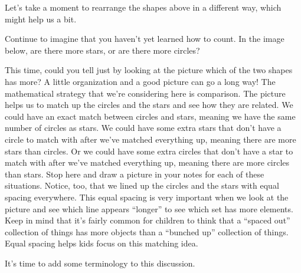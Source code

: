 \documentclass{ximera}
\begin{document}
Let's take a moment to rearrange the shapes above in a different way, which might help us a bit.

\begin{question} \label{oneOneLine}
Continue to imagine that you haven't yet learned how to count. In the image below, are there more stars, or 
are there 
more circles?

\begin{image}
\end{image}

\begin{multipleChoice}
\end{multipleChoice}
\end{question}

This time, could you tell just by looking at the picture which of the two shapes has more? A little organization and a good picture can go a long way!  The mathematical strategy that we're considering here is comparison. The picture helps us to match up the circles and the stars and see how they are related. We could have an exact match between circles and stars, meaning we have the same number of circles as stars. We could have some extra stars that don't have a circle to match with after we've matched everything up, meaning there are more stars than circles. Or we could have some extra circles that don't have a star to match with after we've matched everything up, meaning there are more circles than stars. Stop here and draw a picture in your notes for each of these situations. Notice, too, that we lined up the circles and the stars with equal spacing everywhere. This equal spacing is very important when we look at the picture and see which line appears ``longer'' to see which set has more elements. Keep in mind that it's fairly common for children to think that a ``spaced out'' collection of things has more objects than a ``bunched up'' collection of things. Equal spacing helps kids focus on this matching idea.

It's time to add some terminology to this discussion.
\end{document}
